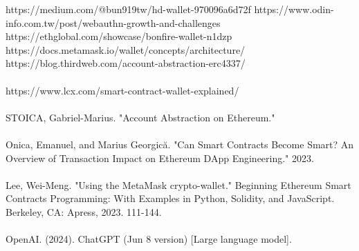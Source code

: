 \documentclass[conference]{IEEEtran}
\begin{document}
\begin{thebibliography}{00}
 https://medium.com/@bun919tw/hd-wallet-970096a6d72f
 https://www.odin-info.com.tw/post/webauthn-growth-and-challenges
 https://ethglobal.com/showcase/bonfire-wallet-n1dzp
 https://docs.metamask.io/wallet/concepts/architecture/
 https://blog.thirdweb.com/account-abstraction-erc4337/\\
 \\
https://www.lcx.com/smart-contract-wallet-explained/\\
 \\
STOICA, Gabriel-Marius. "Account Abstraction on Ethereum."\\
 \\
Onica, Emanuel, and Marius Georgică. "Can Smart Contracts Become Smart? An Overview of Transaction Impact on 
Ethereum DApp Engineering." 2023.\\
 \\
Lee, Wei-Meng. "Using the MetaMask crypto-wallet." Beginning Ethereum Smart Contracts Programming: With Examples 
in Python, Solidity, and JavaScript. Berkeley, CA: Apress, 2023. 111-144.\\
 \\
OpenAI. (2024). ChatGPT (Jun 8 version) [Large language model].
\end{thebibliography}
\end{document}
